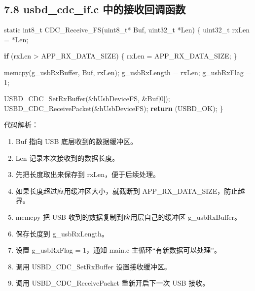 \documentclass[
  chinese,
  UTF8,
  oneside,
  openany]{ctexbook}
\newenvironment{Shaded}{}{}
\newcommand{\ControlFlowTok}[1]{\textcolor[rgb]{0.00,0.44,0.13}{\textbf{#1}}}
\newcommand{\DataTypeTok}[1]{\textcolor[rgb]{0.56,0.13,0.00}{#1}}
\newcommand{\DecValTok}[1]{\textcolor[rgb]{0.25,0.63,0.44}{#1}}
\newcommand{\NormalTok}[1]{#1}
\newcommand{\OperatorTok}[1]{\textcolor[rgb]{0.40,0.40,0.40}{#1}}
\providecommand{\tightlist}{%
  \setlength{\itemsep}{0pt}\setlength{\parskip}{0pt}}
\begin{document}
\subsection{7.8 usbd\_cdc\_if.c
中的接收回调函数}\label{usbd_cdc_if.c-ux4e2dux7684ux63a5ux6536ux56deux8c03ux51fdux6570}

\begin{Shaded}
\begin{Highlighting}[]
\DataTypeTok{static} \DataTypeTok{int8\_t}\NormalTok{ CDC\_Receive\_FS}\OperatorTok{(}\DataTypeTok{uint8\_t}\OperatorTok{*}\NormalTok{ Buf}\OperatorTok{,} \DataTypeTok{uint32\_t} \OperatorTok{*}\NormalTok{Len}\OperatorTok{)}
\OperatorTok{\{}
    \DataTypeTok{uint32\_t}\NormalTok{ rxLen }\OperatorTok{=} \OperatorTok{*}\NormalTok{Len}\OperatorTok{;}

    \ControlFlowTok{if} \OperatorTok{(}\NormalTok{rxLen }\OperatorTok{\textgreater{}}\NormalTok{ APP\_RX\_DATA\_SIZE}\OperatorTok{)}
    \OperatorTok{\{}
\NormalTok{        rxLen }\OperatorTok{=}\NormalTok{ APP\_RX\_DATA\_SIZE}\OperatorTok{;}
    \OperatorTok{\}}

\NormalTok{    memcpy}\OperatorTok{(}\NormalTok{g\_usbRxBuffer}\OperatorTok{,}\NormalTok{ Buf}\OperatorTok{,}\NormalTok{ rxLen}\OperatorTok{);}
\NormalTok{    g\_usbRxLength }\OperatorTok{=}\NormalTok{ rxLen}\OperatorTok{;}
\NormalTok{    g\_usbRxFlag }\OperatorTok{=} \DecValTok{1}\OperatorTok{;}

\NormalTok{    USBD\_CDC\_SetRxBuffer}\OperatorTok{(\&}\NormalTok{hUsbDeviceFS}\OperatorTok{,} \OperatorTok{\&}\NormalTok{Buf}\OperatorTok{[}\DecValTok{0}\OperatorTok{]);}
\NormalTok{    USBD\_CDC\_ReceivePacket}\OperatorTok{(\&}\NormalTok{hUsbDeviceFS}\OperatorTok{);}
    \ControlFlowTok{return} \OperatorTok{(}\NormalTok{USBD\_OK}\OperatorTok{);}
\OperatorTok{\}}
\end{Highlighting}
\end{Shaded}

代码解析：

\begin{enumerate}
\def\labelenumi{\arabic{enumi}.}
\tightlist
\item
  Buf 指向 USB 底层收到的数据缓冲区。
\item
  Len 记录本次接收到的数据长度。
\item
  先把长度取出来保存到 rxLen，便于后续处理。
\item
  如果长度超过应用缓冲区大小，就截断到 APP\_RX\_DATA\_SIZE，防止越界。
\item
  memcpy 把 USB 收到的数据复制到应用层自己的缓冲区 g\_usbRxBuffer。
\item
  保存长度到 g\_usbRxLength。
\item
  设置 g\_usbRxFlag = 1，通知 main.c 主循环``有新数据可以处理''。
\item
  调用 USBD\_CDC\_SetRxBuffer 设置接收缓冲区。
\item
  调用 USBD\_CDC\_ReceivePacket 重新开启下一次 USB 接收。
\end{enumerate}
\end{document}

